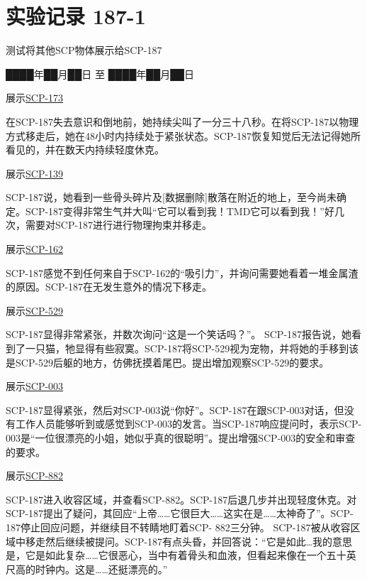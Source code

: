 \section{实验记录 187-1}

\label{sec:DOC-experiment-log-187-1}

测试将其他SCP物体展示给SCP-187

 ████年██月██日 至 ████年██月██日

\hr

展示\hyperref[chap:SCP-173]{SCP-173}

在SCP-187失去意识和倒地前，她持续尖叫了一分三十八秒。在将SCP-187以物理方式移走后，她在48小时内持续处于紧张状态。SCP-187恢复知觉后无法记得她所看见的，并在数天内持续轻度休克。

\hr

展示\hyperref[chap:SCP-139]{SCP-139}

SCP-187说，她看到一些骨头碎片及{[}数据删除]散落在附近的地上，至今尚未确定。SCP-187变得非常生气并大叫“它可以看到我！TMD它可以看到我！”好几次，需要对SCP-187进行进行物理拘束并移走。

\hr

展示\hyperref[chap:SCP-162]{SCP-162}

SCP-187感觉不到任何来自于SCP-162的“吸引力”，并询问需要她看着一堆金属渣的原因。SCP-187在无发生意外的情况下移走。

\hr

展示\hyperref[chap:SCP-529]{SCP-529}

SCP-187显得非常紧张，并数次询问“这是一个笑话吗？”。 SCP-187报告说，她看到了一只猫，牠显得有些寂寞。SCP-187将SCP-529视为宠物，并将她的手移到该是SCP-529后躯的地方，仿佛抚摸着尾巴。提出增加观察SCP-529的要求。

\hr

展示\hyperref[chap:SCP-003]{SCP-003}

SCP-187显得紧张，然后对SCP-003说“你好”。SCP-187在跟SCP-003对话，但没有工作人员能够听到或感觉到SCP-003的发言。当SCP-187响应提问时，表示SCP-003是“一位很漂亮的小姐，她似乎真的很聪明”。提出增强SCP-003的安全和审查的要求。

\hr

展示\hyperref[chap:SCP-882]{SCP-882}

SCP-187进入收容区域，并查看SCP-882。SCP-187后退几步并出现轻度休克。对SCP-187提出了疑问，其回应“上帝……它很巨大……这实在是……太神奇了”。SCP-187停止回应问题，并继续目不转睛地盯着SCP- 882三分钟。 SCP-187被从收容区域中移走然后继续被提问。SCP-187有点头昏，并回答说：“它是如此…我的意思是，它是如此复杂……它很恶心，当中有着骨头和血液，但看起来像在一个五十英尺高的时钟内。这是……还挺漂亮的。”

